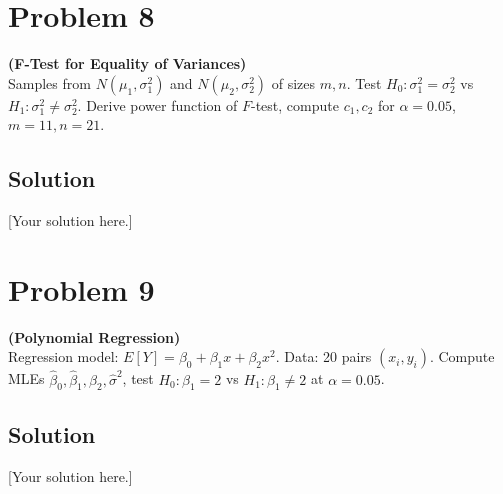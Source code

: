 \documentclass[12pt]{article}
\begin{document}
\section*{Problem 8}
\textbf{(F-Test for Equality of Variances)} \\
Samples from $N(\mu_1,\sigma_1^2)$ and $N(\mu_2,\sigma_2^2)$ of sizes $m,n$. Test $H_0:\sigma_1^2=\sigma_2^2$ vs $H_1:\sigma_1^2 \neq \sigma_2^2$. Derive power function of $F$-test, compute $c_1,c_2$ for $\alpha=0.05$, $m=11,n=21$.

\subsection*{Solution}
[Your solution here.]

\newpage
\section*{Problem 9}
\textbf{(Polynomial Regression)} \\
Regression model: $E[Y]=\beta_0+\beta_1 x+\beta_2 x^2$. Data: 20 pairs $(x_i,y_i)$. Compute MLEs $\hat{\beta}_0,\hat{\beta}_1,\hat{\beta}_2,\hat{\sigma}^2$, test $H_0:\beta_1=2$ vs $H_1:\beta_1\neq 2$ at $\alpha=0.05$.

\subsection*{Solution}
[Your solution here.]
\end{document}
